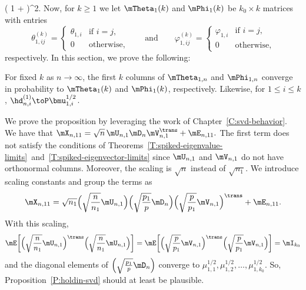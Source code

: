            \left(
                1
                +
            \right)^2.
\)
Now, for $k \geq 1$ we let $\mTheta_{1}(k)$ and $\mPhi_1(k)$ be $k_0 \times k$ matrices with entries
\[
    \theta_{1,ij}^{(k)}
        =
            \begin{cases}
                \theta_{1,i}&\text{if $i = j$,} \\
                0&\text{otherwise,}
            \end{cases}
    \qquad
    \text{and}
    \qquad
    \varphi_{1,ij}^{(k)}
        =
            \begin{cases}
                \varphi_{1,i}&\text{if $i = j$,} \\
                0&\text{otherwise,}
            \end{cases}
\]
respectively.  In this section, we prove the following:

\begin{proposition}\label{P:holdin-svd}
    For fixed $k$ as $n\to\infty$, the first $k$ columns of $\mTheta_{1,n}$
    and $\mPhi_{1,n}$ converge in probability to $\mTheta_{1}(k)$ and 
    $\mPhi_{1}(k)$, respectively.  Likewise, for $1 \leq i \leq k$,
    $\hd_{n,i}^{(1)} \toP \bmu_{1,i}^{1/2}$.
\end{proposition}

We prove the proposition by leveraging the work of 
Chapter~\ref{C:svd-behavior}.  We have that 
\(
    \mX_{n,11} = \sqrt{n} \, \mU_{n,1} \mD_n \mV_{n,1}^\trans + \mE_{n,11}.
\)
The first term does not satisfy the conditions of Theorems~\ref{T:spiked-eigenvalue-limits}~and~\ref{T:spiked-eigenvector-limits} since $\mU_{n,1}$ and $\mV_{n,1}$ do not have orthonormal columns.  Moreover, the scaling is $\sqrt{n}$ instead of $\sqrt{n_1}$.  We introduce scaling constants and group the terms as
\[
    \mX_{n,11}
        =
            \sqrt{n_1}
            \Big(
                \sqrt{\frac{n}{n_1}} \mU_{n,1}
            \Big)
            \Big(
                \sqrt{\frac{p_1}{p}} \mD_n
            \Big)
            \Big(
                \sqrt{\frac{p}{p_1}}
                \mV_{n,1}
            \Big)^\trans
            +
            \mE_{n,11}.
\]
With this scaling,
\[
    \mE \bigg[
        \Big( \sqrt{\frac{n}{n_1}} \mU_{n,1} \Big)^\trans
        \Big( \sqrt{\frac{n}{n_1}} \mU_{n,1} \Big)
    \bigg]
    =
    \mE \bigg[
        \Big( \sqrt{\frac{p}{p_1}} \mV_{n,1} \Big)^\trans
        \Big( \sqrt{\frac{p}{p_1}} \mV_{n,1} \Big)
    \bigg]
    =
    \mI_{k_0}
\]
and the diagonal elements of
\(
    \Big(
          \sqrt{\frac{p_1}{p}} \mD_n
    \Big)
\)
converge to 
\(
    \mu_{1,1}^{1/2},
    \mu_{1,2}^{1/2},
    \ldots,
    \mu_{1,k_0}^{1/2}.
\)
So, Proposition~\ref{P:holdin-svd} should at least be plausible.  

